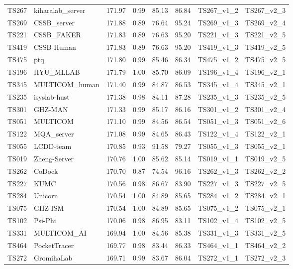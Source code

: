 \begin{longtable}{llllllll}
TS267 & kiharalab\_server & 171.97 & 0.99 & 85.13 & 86.84 & TS267\_v1\_2 & TS267\_v2\_3 \\ 
TS269 & CSSB\_server & 171.88 & 0.89 & 76.64 & 95.24 & TS269\_v1\_3 & TS269\_v2\_4 \\ 
TS221 & CSSB\_FAKER & 171.83 & 0.89 & 76.63 & 95.20 & TS221\_v1\_3 & TS221\_v2\_5 \\ 
TS419 & CSSB-Human & 171.83 & 0.89 & 76.63 & 95.20 & TS419\_v1\_3 & TS419\_v2\_5 \\ 
TS475 & ptq & 171.80 & 0.99 & 85.46 & 86.34 & TS475\_v1\_2 & TS475\_v2\_5 \\ 
TS196 & HYU\_MLLAB & 171.79 & 1.00 & 85.70 & 86.09 & TS196\_v1\_4 & TS196\_v2\_1 \\ 
TS345 & MULTICOM\_human & 171.40 & 0.99 & 84.87 & 86.53 & TS345\_v1\_4 & TS345\_v2\_1 \\ 
TS235 & isyslab-hust & 171.38 & 0.98 & 84.11 & 87.28 & TS235\_v1\_3 & TS235\_v2\_5 \\ 
TS301 & GHZ-MAN & 171.33 & 0.99 & 85.17 & 86.16 & TS301\_v1\_2 & TS301\_v2\_4 \\ 
TS051 & MULTICOM & 171.10 & 0.99 & 84.56 & 86.54 & TS051\_v1\_3 & TS051\_v2\_6 \\ 
TS122 & MQA\_server & 171.08 & 0.99 & 84.65 & 86.43 & TS122\_v1\_4 & TS122\_v2\_1 \\ 
TS055 & LCDD-team & 170.85 & 0.93 & 91.58 & 79.27 & TS055\_v1\_3 & TS055\_v2\_1 \\ 
TS019 & Zheng-Server & 170.76 & 1.00 & 85.62 & 85.14 & TS019\_v1\_1 & TS019\_v2\_5 \\ 
TS262 & CoDock & 170.70 & 0.87 & 74.54 & 96.16 & TS262\_v1\_3 & TS262\_v2\_2 \\ 
TS227 & KUMC & 170.56 & 0.98 & 86.67 & 83.90 & TS227\_v1\_3 & TS227\_v2\_5 \\ 
TS284 & Unicorn & 170.54 & 1.00 & 84.89 & 85.65 & TS284\_v1\_2 & TS284\_v2\_1 \\ 
TS075 & GHZ-ISM & 170.54 & 1.00 & 84.89 & 85.65 & TS075\_v1\_2 & TS075\_v2\_1 \\ 
TS102 & Psi-Phi & 170.06 & 0.98 & 86.95 & 83.11 & TS102\_v1\_4 & TS102\_v2\_5 \\ 
TS331 & MULTICOM\_AI & 169.94 & 1.00 & 84.56 & 85.38 & TS331\_v1\_3 & TS331\_v2\_5 \\ 
TS464 & PocketTracer & 169.77 & 0.98 & 83.44 & 86.33 & TS464\_v1\_1 & TS464\_v2\_2 \\ 
TS272 & GromihaLab & 169.71 & 0.99 & 83.67 & 86.04 & TS272\_v1\_1 & TS272\_v2\_3 \\ 

\end{longtable}
